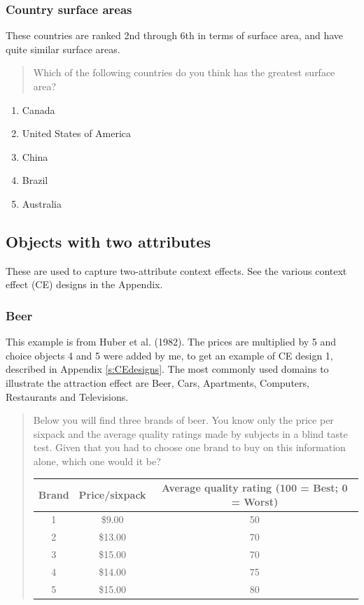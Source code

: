 \documentclass[11pt,letter]{amsart}
\begin{document}
\subsubsection{Country surface areas}

These countries are ranked 2nd through 6th in terms of surface area, and have quite similar surface areas.

\begin{quotation}
Which of the following countries do you think has the greatest surface area?
\end{quotation}

\begin{enumerate}
\item Canada 

\item United States of America 

\item China 

\item Brazil 

\item Australia
\end{enumerate}

\subsection{Objects with two attributes}

These are used to capture two-attribute context effects. See the various
context effect (CE) designs in the Appendix.

\subsubsection{Beer}

This example is from Huber et al. (1982). The prices are multiplied by 5 and
choice objects 4 and 5 were added by me, to get an example of CE design 1,
described in Appendix \ref{s:CEdesigns}. The most commonly used domains to
illustrate the attraction effect are Beer, Cars, Apartments, Computers,
Restaurants and Televisions.

\begin{quotation}
Below you will find three brands of beer. You know only the price per
sixpack and the average quality ratings made by subjects in a blind taste
test. Given that you had to choose one brand to buy on this information
alone, which one would it be?

\begin{tabular}{ccc}
\hline
Brand & Price/sixpack & Average quality rating (100 = Best; 0 = Worst) \\ 
\hline
1 & \$9.00 & 50 \\ 
2 & \$13.00 & 70 \\ 
3 & \$15.00 & 70 \\ 
4 & \$14.00 & 75 \\ 
5 & \$15.00 & 80 \\ \hline
\end{tabular}
\end{quotation}
\end{document}
